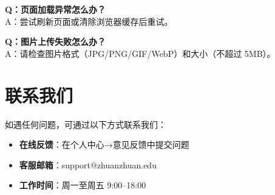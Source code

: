 \documentclass[12pt,a4paper,UTF8]{ctexart}
\begin{document}
\textbf{Q：页面加载异常怎么办？}\\
A：尝试刷新页面或清除浏览器缓存后重试。

\textbf{Q：图片上传失败怎么办？}\\
A：请检查图片格式（JPG/PNG/GIF/WebP）和大小（不超过 5MB）。

\section*{联系我们}

如遇任何问题，可通过以下方式联系我们：
\begin{itemize}
    \item \textbf{在线反馈}：在个人中心→意见反馈中提交问题
    \item \textbf{客服邮箱}：support@zhuanzhuan.edu
    \item \textbf{工作时间}：周一至周五 9:00--18:00
\end{itemize}
\end{document}
